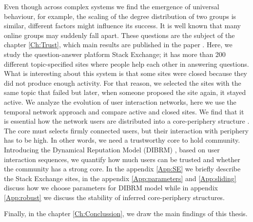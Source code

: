 Even though across complex systems we find the emergence of universal behaviour, for example, the scaling of the degree distribution of two groups is similar, different factors might influence its success. It is well known that many online groups may suddenly fall apart. These questions are the subject of the chapter \ref{Ch:Trust}, which main results are published in the paper \cite{vranic2022sustainability}. Here, we study the question-answer platform Stack Exchange; it has more than 200 different topic-specified sites where people help each other in answering questions. What is interesting about this system is that some sites were closed because they did not produce enough activity. For that reason, we selected the sites with the same topic that failed but later, when someone proposed the site again, it stayed active. We analyze the evolution of user interaction networks, here we use the temporal network approach and compare active and closed sites. We find that it is essential how the network users are distributed into a core-periphery structure \cite{gallagher2020clarified}. The core must selects firmly connected users, but their interaction with periphery has to be high. In other words, we need a trustworthy core to hold community. Introducing the Dynamical Reputation Model (DIBRM) \cite{melnikov2018toward}, based on user interaction sequences, we quantify how much users can be trusted and whether the community has a strong core. In the appendix \ref{App:SE} we briefly describe the Stack Exchange sites, in the appendix \ref{App:parameters} and \ref{App:sliding} discuss how we choose parameters  for DIBRM model while in appendix \ref{App:robust} we discuss the stability of inferred core-periphery structures. 

Finally, in the chapter \ref{Ch:Conclussion}, we draw the main findings of this thesis. 

















